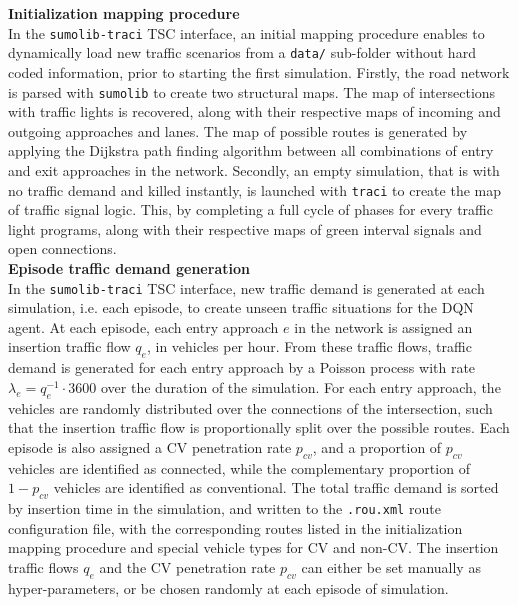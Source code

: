 \textbf{Initialization mapping procedure} \\
In the \texttt{sumolib-traci} TSC interface, an initial mapping procedure enables to dynamically load new traffic scenarios from a \texttt{data/} sub-folder without hard coded information, prior to starting the first simulation. Firstly, the road network is parsed with \texttt{sumolib} to create two structural maps. The map of intersections with traffic lights is recovered, along with their respective maps of incoming and outgoing approaches and lanes. The map of possible routes is generated by applying the Dijkstra path finding algorithm between all combinations of entry and exit approaches in the network. Secondly, an empty simulation, that is with no traffic demand and killed instantly, is launched with \texttt{traci} to create the map of traffic signal logic. This, by completing a full cycle of phases for every traffic light programs, along with their respective maps of green interval signals and open connections. \\

\textbf{Episode traffic demand generation} \\
In the \texttt{sumolib-traci} TSC interface, new traffic demand is generated at each simulation, i.e. each episode, to create unseen traffic situations for the DQN agent. At each episode, each entry approach $e$ in the network is assigned an insertion traffic flow $q_e$, in vehicles per hour. From these traffic flows, traffic demand is generated for each entry approach by a Poisson process with rate $\lambda_e = q_e^{-1}\cdot 3600$ over the duration of the simulation. For each entry approach, the vehicles are randomly distributed over the connections of the intersection, such that the insertion traffic flow is proportionally split over the possible routes. Each episode is also assigned a CV penetration rate $p_{cv}$, and a proportion of $p_{cv}$ vehicles are identified as connected, while the complementary proportion of $1-p_{cv}$ vehicles are identified as conventional. The total traffic demand is sorted by insertion time in the simulation, and written to the \texttt{.rou.xml} route configuration file, with the corresponding routes listed in the initialization mapping procedure and special vehicle types for CV and non-CV. The insertion traffic flows $q_e$ and the CV penetration rate $p_{cv}$ can either be set manually as hyper-parameters, or be chosen randomly at each episode of simulation. \\

